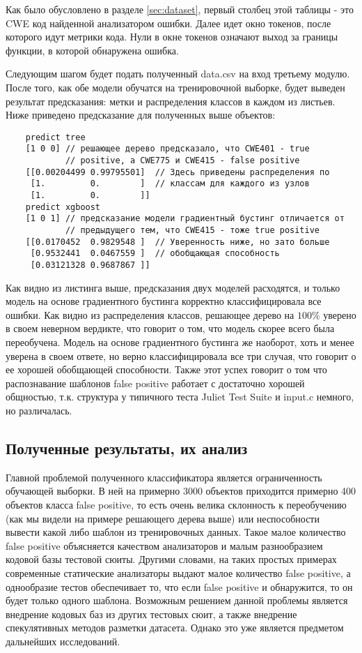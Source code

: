 Как было обусловлено в разделе \ref{sec:dataset}, первый столбец этой таблицы - это CWE код найденной анализатором ошибки. Далее идет окно токенов, после которого идут метрики кода. Нули в окне токенов означают выход за границы функции, в которой обнаружена ошибка.

Следующим шагом будет подать полученный data.csv на вход третьему модулю. После того, как обе модели обучатся на тренировочной выборке, будет выведен результат предсказания: метки и распределения классов в каждом из листьев. Ниже приведено предсказание для полученных выше объектов:

\begin{verbatim}
    predict tree
    [1 0 0] // решающее дерево предсказало, что CWE401 - true 
            // positive, а CWE775 и CWE415 - false positive 
    [[0.00204499 0.99795501]  // Здесь приведены распределения по
     [1.         0.        ]  // классам для каждого из узлов
     [1.         0.        ]]  
    predict xgboost
    [1 0 1] // предсказание модели градиентный бустинг отличается от
            // предыдущего тем, что CWE415 - тоже true positive
    [[0.0170452  0.9829548 ]  // Уверенность ниже, но зато больше 
     [0.9532441  0.0467559 ]  // обобщающая способность
     [0.03121328 0.9687867 ]]
\end{verbatim}

Как видно из листинга выше, предсказания двух моделей расходятся, и только модель на основе градиентного бустинга корректно классифицировала все ошибки. Как видно из распределения классов, решающее дерево на $100\%$ уверено в своем неверном вердикте, что говорит о том, что модель скорее всего была переобучена. Модель на основе градиентного бустинга же наоборот, хоть и менее уверена в своем ответе, но верно классифицировала все три случая, что говорит о ее хорошей обобщающей способности. Также этот успех говорит о том что распознавание шаблонов false positive работает с достаточно хорошей общностью, т.к. структура у типичного теста Juliet Test Suite и input.c немного, но различалась.

\subsection{Полученные результаты, их анализ}

Главной проблемой полученного классификатора является ограниченность обучающей выборки. В ней на примерно 3000 объектов приходится примерно 400 объектов класса false positive, то есть очень велика склонность к переобучению (как мы видели на примере решающего дерева выше) или неспособности вывести какой либо шаблон из тренировочных данных. Такое малое количество false positive объясняется качеством анализаторов и малым разнообразием кодовой базы тестовой сюиты. Другими словами, на таких простых примерах современные статические анализаторы выдают малое количество false positive, а однообразие тестов обеспечивает то, что если false positive и обнаружится, то он будет только одного шаблона. Возможным решением данной проблемы является внедрение кодовых баз из других тестовых сюит, а также внедрение спекулятивных методов разметки датасета. Однако это уже является предметом дальнейших исследований.

